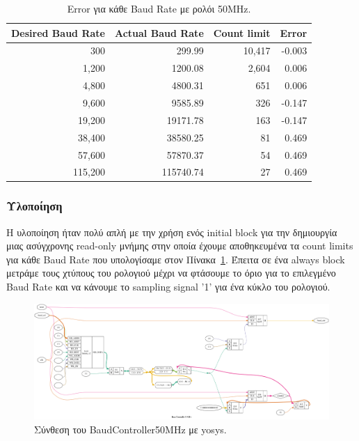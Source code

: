 \documentclass[../main.tex]{subfiles}
\begin{document}
\begin{table}[H]
  \renewcommand{\arraystretch}{1.3}
  \caption{Error για κάθε Baud Rate με ρολόι 50MHz.}
  \label{tab:baudrate}
  \centering
  \begin{tabular}{rrrr}
    \hline
    \bf Desired Baud Rate & \bf Actual Baud Rate & \bf Count limit & \bf Error \\
    \hline\hline
                      300 &               299.99 &          10,417 &    -0.003 \\
                    1,200 &              1200.08 &           2,604 &     0.006 \\
                    4,800 &              4800.31 &             651 &     0.006 \\
                    9,600 &              9585.89 &             326 &    -0.147 \\
                   19,200 &             19171.78 &             163 &    -0.147 \\
                   38,400 &             38580.25 &              81 &     0.469 \\
                   57,600 &             57870.37 &              54 &     0.469 \\
                  115,200 &            115740.74 &              27 &     0.469 \\
    \hline
  \end{tabular}
\end{table}

\subsubsection*{Υλοποίηση}

Η υλοποίηση ήταν πολύ απλή με την χρήση ενός initial block για την δημιουργία
μιας ασύγχρονης read-only μνήμης στην οποία έχουμε αποθηκευμένα τα count limits
για κάθε Baud Rate που υπολογίσαμε στον Πίνακα~\ref{tab:baudrate}. Έπειτα σε ένα
always block μετράμε τους χτύπους του ρολογιού μέχρι να φτάσουμε το όριο για το
επιλεγμένο Baud Rate και να κάνουμε το sampling signal '1' για ένα κύκλο του
ρολογιού.

\begin{figure}[H]
  \begin{center}
    \includegraphics[width=\textwidth]{../../diagrams/BaudController50MHz.png}
  \end{center}
  \caption{Σύνθεση του BaudController50MHz με yosys.}
\end{figure}
\end{document}
